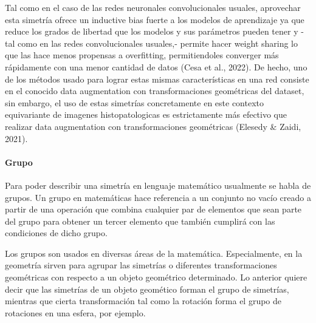 \documentclass[12pt,letterpaper,final, openany]{scrbook}
\begin{document}
Tal como en el caso de las redes neuronales convolucionales usuales, aprovechar esta simetría ofrece un inductive bias fuerte a los modelos de aprendizaje ya que reduce los grados de libertad que los modelos y sus parámetros pueden tener y -tal como en las redes convolucionales usuales,- permite hacer weight sharing lo que las hace menos propensas a overfitting, permitiendoles converger más rápidamente con una menor cantidad de datos (Cesa et al., 2022). De hecho, uno de los métodos usado para lograr estas mismas características en una red consiste en el conocido data augmentation con transformaciones geométricas del dataset, sin embargo, el uso de estas simetrías concretamente en este contexto equivariante de imagenes histopatologicas es estrictamente más efectivo que realizar data augmentation con transformaciones geométricas (Elesedy \& Zaidi, 2021).


\paragraph{Grupo}

Para poder describir una simetría en lenguaje matemático usualmente se habla de grupos. Un grupo en matemáticas hace referencia a un conjunto no vacío creado a partir de una operación que combina cualquier par de elementos que sean parte del grupo para obtener un tercer elemento que también cumplirá con las condiciones de dicho grupo.

Los grupos son usados en diversas áreas de la matemática. Especialmente, en la geometría sirven para agrupar las simetrías o diferentes transformaciones geométricas con respecto a un objeto geométrico determinado. Lo anterior quiere decir que las simetrías de un objeto geomético forman el grupo de simetrías, mientras que cierta transformación tal como la rotación forma el grupo de rotaciones en una esfera, por ejemplo. 
\end{document}
